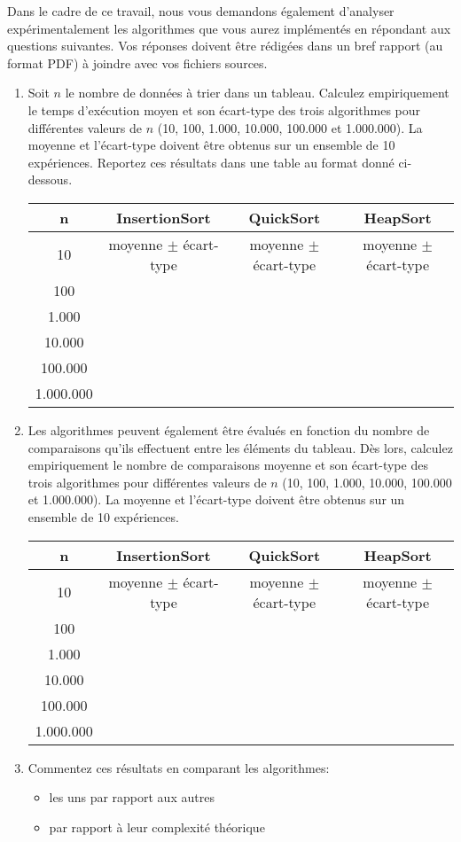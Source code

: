 \documentclass[a4paper,10pt]{article}
\begin{document}
Dans le cadre de ce travail, nous vous demandons également d'analyser
expérimentalement les algorithmes que vous aurez implémentés en répondant aux
questions suivantes. Vos réponses doivent être rédigées dans un bref rapport (au
format PDF) à joindre avec vos fichiers sources.

\begin{enumerate}
\item Soit $n$ le nombre de données à trier dans un tableau. Calculez
empiriquement le temps d'exécution moyen et son écart-type des trois
algorithmes pour différentes valeurs de $n$ (10, 100, 1.000, 10.000,
100.000 et 1.000.000). La moyenne et l'écart-type doivent être obtenus
sur un ensemble de 10 expériences. Reportez ces résultats dans une table au format donné ci-dessous.

\begin{center}
\begin{tabular}{cccc}
	\hline
	n & InsertionSort & QuickSort & HeapSort \\
	\hline
	10 & moyenne $\pm$ écart-type & moyenne $\pm$ écart-type & moyenne $\pm$ écart-type\\
	100 & & &\\
	1.000 & & &\\
	10.000 & & &\\
	100.000 & & &\\
	1.000.000 & & &\\
\end{tabular}
\end{center}
\item Les algorithmes peuvent également être évalués en fonction du nombre de
comparaisons qu'ils effectuent entre les éléments du tableau. Dès lors, calculez
empiriquement le nombre de comparaisons moyenne et son écart-type des trois
algorithmes pour différentes valeurs de $n$ (10, 100, 1.000, 10.000, 100.000 et
1.000.000). La moyenne et l'écart-type doivent être obtenus sur un ensemble de
10 expériences.
\begin{center}
\begin{tabular}{cccc}
	\hline
	n & InsertionSort & QuickSort & HeapSort \\
	\hline
	10 & moyenne $\pm$ écart-type & moyenne $\pm$ écart-type & moyenne $\pm$ écart-type\\
	100 & & &\\
	1.000 & & &\\
	10.000 & & &\\
	100.000 & & &\\
	1.000.000 & & &\\
\end{tabular}
\end{center}

\item Commentez ces résultats en comparant les algorithmes:
\begin{itemize}
\item les uns par rapport aux autres
\item par rapport à leur complexité théorique
\end{itemize}
\end{enumerate}
\end{document}
